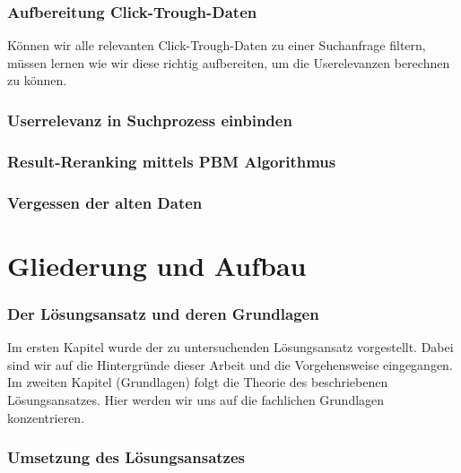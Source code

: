 \subsubsection{Aufbereitung Click-Trough-Daten}
\label{sec:Einfuehrung:Methodik:Reranking:Click-Trough-Daten}

Können wir alle relevanten Click-Trough-Daten zu einer Suchanfrage filtern, müssen lernen wie wir diese richtig aufbereiten, um die Userelevanzen berechnen zu können. 

\subsubsection{Userrelevanz in Suchprozess einbinden}
\label{sec:Einfuehrung:Methodik:Reranking:SucheEinbinden}


\subsubsection{Result-Reranking mittels PBM Algorithmus}
\label{sec:Einfuehrung:Methodik:Reranking:Result-RerankingPBM}

\subsubsection{Vergessen der alten Daten}
\label{sec:Einfuehrung:Reranking:Vergessen}


\section{Gliederung und Aufbau}
\label{sec:Einfuehrung:GliederungAufbau}

\subsubsection{Der Lösungsansatz und deren Grundlagen}
\label{sec:Einfuehrung:GliederungAufbau:Loesungsansatz}

Im ersten Kapitel wurde der zu untersuchenden Lösungsansatz vorgestellt. Dabei sind wir auf die Hintergründe dieser Arbeit und die Vorgehensweise eingegangen. Im zweiten Kapitel (Grundlagen) folgt die Theorie des beschriebenen Lösungsansatzes. Hier werden wir uns auf die fachlichen Grundlagen konzentrieren. 

\subsubsection{Umsetzung des Lösungsansatzes}
\label{sec:Einfuehrung:GliederungAufbau:Umsetzung}

